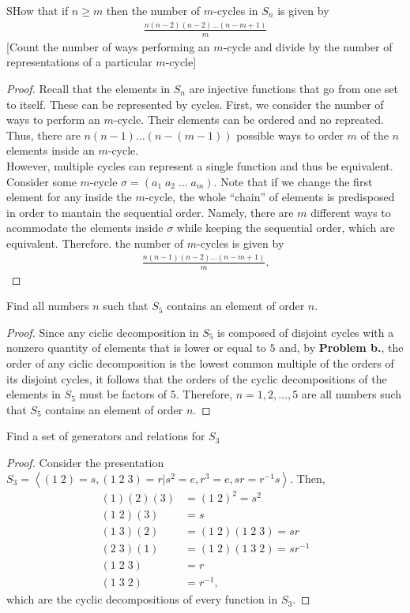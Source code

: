 \documentclass[12pt]{article}
\newenvironment{problem}[2][Problem]{\begin{trivlist} \item[\hskip \labelsep {\bfseries #1}\hskip \labelsep {\bfseries #2.}]}{\end{trivlist}}
\begin{document}
\begin{problem}{16}
  SHow that if $n\geq m$ then the number of $m$-cycles in $S_{n}$ is given by
\begin{align*}
  \frac{n(n-2)(n-2)\dots(n-m+1)}{m}
\end{align*}
[Count the number of ways performing an $m$-cycle and divide by the number of representations of a particular $m$-cycle]
\begin{proof}
  Recall that the elements in $S_{n}$ are injective functions that go from one set to itself. These can be represented by cycles. First, we consider the number of ways to perform an $m$-cycle. Their elements can be ordered and no repreated. Thus, there are $n(n-1)\dots(n-(m-1))$ possible ways to order $m$ of the $n$ elements inside an $m$-cycle. \\
  However, multiple cycles can represent a single function and thus be equivalent. Consider some $m$-cycle $\sigma=(a_{1}\;a_{2}\;\dots\;a_{m})$. Note that if  we change the first element for any inside the $m$-cycle, the whole ``chain'' of elements is predisposed in order to mantain the sequential order. Namely, there are $m$ different ways to acommodate the elements inside $\sigma$ while keeping the sequential order, which are equivalent. Therefore. the number of $m$-cycles is given by
\begin{align*}
  \frac{n(n-1)(n-2)\dots(n-m+1)}{m}.
\end{align*}
\end{proof}
\end{problem}


\begin{problem}{18}
  Find all numbers $n$ such that $S_{5}$ contains an element of order $n$.
\begin{proof}
  Since any ciclic decomposition in $S_{5}$ is composed of disjoint cycles with a nonzero quantity of elements that is lower or equal to $5$  and, by \textbf{Problem b.}, the order of any ciclic decomposition is the lowest common multiple of the orders of its disjoint cycles, it follows that the orders of the cyclic decompositions of the elements in $S_{5}$ must be factors of $5$. Therefore, $n=1,2,\dots,5$ are all numbers such that $S_{5}$ contains an element of order $n$.

\end{proof}
\end{problem}
\begin{problem}{20}
  Find a set of generators and relations for $S_{3}$
\begin{proof}
  Consider the presentation $S_{3} = \left< (1\;2)=s,(1\;2\;3)=r| s^{2}=e,r^{3}=e,sr=r^{-1}s \right>$. Then,
\begin{align*}
  (1)(2)(3) &= (1\;2)^{2} = s^{2}\\
  (1\;2)(3) &= s\\
  (1\;3)(2) &= (1\;2)(1\;2\;3) = sr\\
  (2\;3)(1) &= (1\;2)(1\;3\;2) = sr^{-1}\\
  (1\;2\;3) &= r\\
  (1\;3\;2) &= r^{-1},
\end{align*}
which are the cyclic decompositions of every function in $S_{3}$.
\end{proof}
\end{problem}
       
\end{document}
